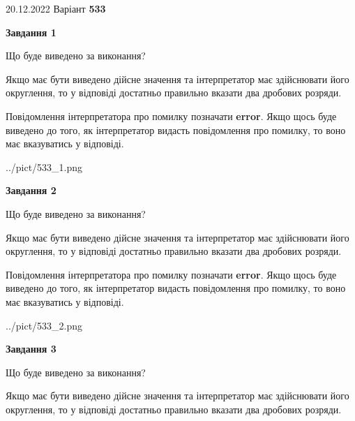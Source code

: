 \documentclass[12pt, ukrainian]{article}
\begin{document}
{20.12.2022 Варіант \No \textbf { 533 }\par}
{
\begin {Large}

{\begin {center}\textbf{Завдання 1}\end {center}}\par
Що буде виведено за виконання? \par

Якщо має бути виведено дійсне значення та інтерпретатор має здійснювати його округлення, 
то у відповіді достатньо правильно вказати два дробових розряди.

Повідомлення інтерпретатора про помилку позначати \textbf{error}.
Якщо щось буде виведено до того, як інтерпретатор видасть повідомлення про помилку, 
то воно має вказуватись у відповіді. \par

\begin{center}
	{../pict/533_1.png}
\end{center}
\newpage

{\begin {center}\textbf{Завдання 2}\end {center}}\par
Що буде виведено за виконання? \par

Якщо має бути виведено дійсне значення та інтерпретатор має здійснювати його округлення, 
то у відповіді достатньо правильно вказати два дробових розряди.

Повідомлення інтерпретатора про помилку позначати \textbf{error}.
Якщо щось буде виведено до того, як інтерпретатор видасть повідомлення про помилку, 
то воно має вказуватись у відповіді. \par

\begin{center}
	{../pict/533_2.png}
\end{center}
\newpage

{\begin {center}\textbf{Завдання 3}\end {center}}\par
Що буде виведено за виконання? \par

Якщо має бути виведено дійсне значення та інтерпретатор має здійснювати його округлення, 
то у відповіді достатньо правильно вказати два дробових розряди.


\end{Large}}
\end{document}
